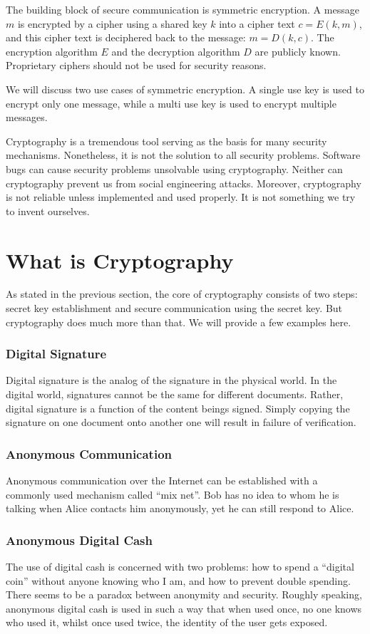 The building block of secure communication is symmetric encryption. A message $m$ is encrypted by a cipher using a shared key $k$ into a cipher text $c=E(k,m)$, and this cipher text is deciphered back to the message: $m=D(k,c)$. The encryption algorithm $E$ and the decryption algorithm $D$ are publicly known. Proprietary ciphers should not be used for security reasons.

We will discuss two use cases of symmetric encryption. A single use key is used to encrypt only one message, while a multi use key is used to encrypt multiple messages. 

Cryptography is a tremendous tool serving as the basis for many security mechanisms. Nonetheless, it is not the solution to all security problems. Software bugs can cause security problems unsolvable using cryptography. Neither can cryptography prevent us from social engineering attacks. Moreover, cryptography is not reliable unless implemented and used properly. It is not something we try to invent ourselves. 

\section{What is Cryptography}
As stated in the previous section, the core of cryptography consists of two steps: secret key establishment and secure communication using the secret key. But cryptography does much more than that. We will provide a few examples here. 
\subsubsection{Digital Signature}
Digital signature is the analog of the signature in the physical world. In the digital world, signatures cannot be the same for different documents. Rather, digital signature is a function of the content beings signed. Simply copying the signature on one document onto another one will result in failure of verification.
\subsubsection{Anonymous Communication}
Anonymous communication over the Internet can be established with a commonly used mechanism called ``mix net''. Bob has no idea to whom he is talking when Alice contacts him anonymously, yet he can still respond to Alice.
\subsubsection{Anonymous Digital Cash}
The use of digital cash is concerned with two problems: how to spend a ``digital coin'' without anyone knowing who I am, and how to prevent double spending. There seems to be a paradox between anonymity and security. Roughly speaking, anonymous digital cash is used in such a way that when used once, no one knows who used it, whilst once used twice, the identity of the user gets exposed. 

